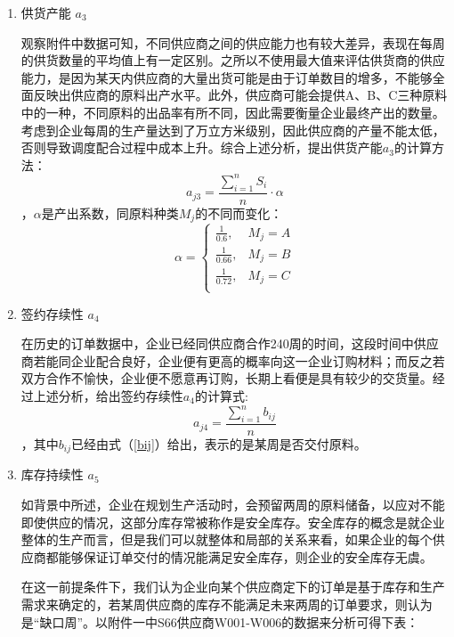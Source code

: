 \documentclass{my_paper}
\begin{document}
\begin{enumerate}
    \item 供货产能 $a_3$
    
    观察附件中数据可知，不同供应商之间的供应能力也有较大差异，表现在每周的供货数量的平均值上有一定区别。之所以不使用最大值来评估供货商的供应能力，是因为某天内供应商的大量出货可能是由于订单数目的增多，不能够全面反映出供应商的原料出产水平。此外，供应商可能会提供A、B、C三种原料中的一种，不同原料的出品率有所不同，因此需要衡量企业最终产出的数量。考虑到企业每周的生产量达到了万立方米级别，因此供应商的产量不能太低，否则导致调度配合过程中成本上升。综合上述分析，提出供货产能$a_3$的计算方法：
    \begin{equation}
    a_{j3}=\frac{\sum\limits^n_{i=1} S_i}{n}\cdot \alpha
    \label{aj3}
    \end{equation}
    ，$\alpha$是产出系数，同原料种类$M_j$的不同而变化：
    $$\alpha=\begin{cases}
        \frac{1}{0.6} ,& M_j=A\\
        \frac{1}{0.66} ,& M_j=B\\
        \frac{1}{0.72} ,& M_j=C\\
    \end{cases}$$

    \item 签约存续性 $a_4$
    
    在历史的订单数据中，企业已经同供应商合作240周的时间，这段时间中供应商若能同企业配合良好，企业便有更高的概率向这一企业订购材料；而反之若双方合作不愉快，企业便不愿意再订购，长期上看便是具有较少的交货量。经过上述分析，给出签约存续性$a_{4}$的计算式:
    \begin{equation}
    a_{j4}=\frac{\sum\limits^n_{i=1}b_{ij}}{n}
    \label{aj4}
    \end{equation}
    ，其中$b_{ij}$已经由式（\ref{bij}）给出，表示的是某周是否交付原料。

    \item 库存持续性 $a_5$
    
    如背景中所述，企业在规划生产活动时，会预留两周的原料储备，以应对不能即使供应的情况，这部分库存常被称作是安全库存\cite{1}。安全库存的概念是就企业整体的生产而言，但是我们可以就整体和局部的关系来看，如果企业的每个供应商都能够保证订单交付的情况能满足安全库存，则企业的安全库存无虞。
    
    在这一前提条件下，我们认为企业向某个供应商定下的订单是基于库存和生产需求来确定的，若某周供应商的库存不能满足未来两周的订单要求，则认为是“缺口周”。以附件一中S66供应商W001-W006的数据来分析可得下表：
    \begin{table}[ht]


\end{table}
\end{enumerate}
\end{document}
